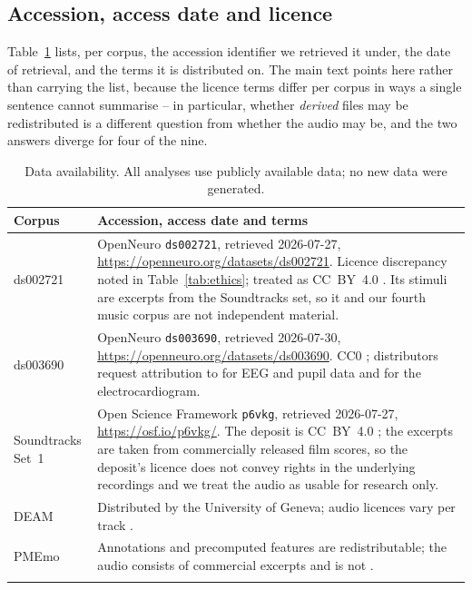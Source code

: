 \subsection{Accession, access date and licence}

Table~\ref{tab:dataavail} lists, per corpus, the accession identifier we
retrieved it under, the date of retrieval, and the terms it is distributed
on. The main text points here rather than carrying the list, because the
licence terms differ per corpus in ways a single sentence cannot summarise
-- in particular, whether \emph{derived} files may be redistributed is a
different question from whether the audio may be, and the two answers
diverge for four of the nine.

\begin{table}[htbp]
\centering\footnotesize
\caption{Data availability. All analyses use publicly available data; no new
data were generated.}
\label{tab:dataavail}
\begin{tabular}{p{2.2cm}p{11.4cm}}
\toprule
Corpus & Accession, access date and terms \\
\midrule
ds002721 & OpenNeuro \texttt{ds002721}, retrieved 2026-07-27,
\url{https://openneuro.org/datasets/ds002721}. Licence discrepancy noted in
Table~\ref{tab:ethics}; treated as CC~BY~4.0 \cite{daly2018data}.
Its stimuli are excerpts from the Soundtracks set, so it and our fourth music
corpus are not independent material. \\
\addlinespace
ds003690 & OpenNeuro \texttt{ds003690}, retrieved 2026-07-30,
\url{https://openneuro.org/datasets/ds003690}. CC0 \cite{ds003690};
distributors request attribution to \cite{ribeiro2019erp} for EEG and pupil
data and \cite{ribeiro2019cardiac} for the electrocardiogram. \\
\addlinespace
Soundtracks Set~1 & Open Science Framework \texttt{p6vkg}, retrieved
2026-07-27, \url{https://osf.io/p6vkg/}. The deposit is CC~BY~4.0
\cite{eerola2011}; the excerpts are taken from commercially released film
scores, so the deposit's licence does not convey rights in the underlying
recordings and we treat the audio as usable for research only. \\
\addlinespace
DEAM & Distributed by the University of Geneva; audio licences vary per track
\cite{aljanaki2017}. \\
\addlinespace
PMEmo & Annotations and precomputed features are redistributable; the audio
consists of commercial excerpts and is not \cite{zhang2018pmemo}. \\
\addlinespace

\end{tabular}
\end{table}
